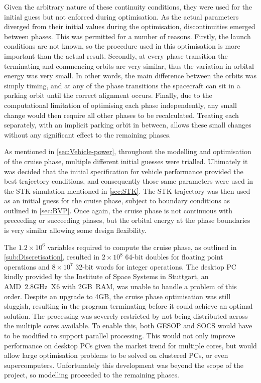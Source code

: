 Given the arbitrary nature of these continuity conditions, they were used for the initial guess but not enforced during optimisation. As the actual parameters diverged from their initial values during the optimisation, discontinuities emerged between phases. This was permitted for a number of reasons. Firstly, the launch conditions are not known, so the procedure used in this optimisation is more important than the actual result. Secondly, at every phase transition the terminating and commencing orbits are very similar, thus the variation in orbital energy was very small. In other words, the main difference between the orbits was simply timing, and at any of the phase transitions the spacecraft can sit in a parking orbit until the correct alignment occurs. Finally, due to the computational limitation of optimising each phase independently, any small change would then require all other phases to be recalculated. Treating each separately, with an implicit parking orbit in between, allows these small changes without any significant effect to the remaining phases.

As mentioned in \autoref{sec:Vehicle-power}, throughout the modelling and optimisation of the cruise phase, multiple different initial guesses were trialled. Ultimately it was decided that the initial specification for vehicle performance provided the best trajectory conditions, and consequently those same parameters were used in the STK simulation mentioned in \autoref{sec:STK}. The STK trajectory was then used as an initial guess for the cruise phase, subject to boundary conditions as outlined in \autoref{sec:BVP}. Once again, the cruise phase is not continuous with preceeding or succeeding phases, but the orbital energy at the phase boundaries is very similar allowing some design flexibility.

The $1.2\times10^6$ variables required to compute the cruise phase, as outlined in \autoref{sub:Discretisation}, resulted in $2\times10^8$ 64-bit doubles for floating point operations and $8\times10^7$ 32-bit words for integer operations. The desktop PC kindly provided by the Institute of Space Systems in Stuttgart, an AMD~2.8GHz~X6 with 2GB~RAM, was unable to handle a problem of this order. Despite an upgrade to 4GB, the cruise phase optimisation was still sluggish, resulting in the program terminating before it could achieve an optimal solution. The processing was severely restricted by not being distributed across the multiple cores available. To enable this, both GESOP and SOCS would have to be modified to support parallel processing. This would not only improve performance on desktop PCs given the market trend for multiple cores, but would allow large optimisation problems to be solved on clustered PCs, or even supercomputers. Unfortunately this development was beyond the scope of the project, so modelling proceeded to the remaining phases.


